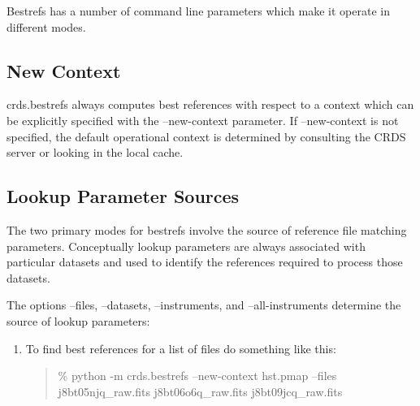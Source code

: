 \documentclass[letterpaper,10pt,english]{sphinxmanual}
\begin{document}
Bestrefs has a number of command line parameters which make it operate in different modes.


\subsection{New Context}
\label{command_line_tools:new-context}
crds.bestrefs always computes best references with respect to a context which can be explicitly specified with the
--new-context parameter.    If --new-context is not specified,  the default operational context is determined by
consulting the CRDS server or looking in the local cache.


\subsection{Lookup Parameter Sources}
\label{command_line_tools:lookup-parameter-sources}
The two primary modes for bestrefs involve the source of reference file matching parameters.   Conceptually
lookup parameters are always associated with particular datasets and used to identify the references
required to process those datasets.

The options --files, --datasets, --instruments, and --all-instruments determine the source of lookup parameters:
\begin{enumerate}
\item {} 
To find best references for a list of files do something like this:
\begin{quote}

\% python -m crds.bestrefs --new-context hst.pmap --files j8bt05njq\_raw.fits j8bt06o6q\_raw.fits j8bt09jcq\_raw.fits
\end{quote}

\end{enumerate}
\end{document}
